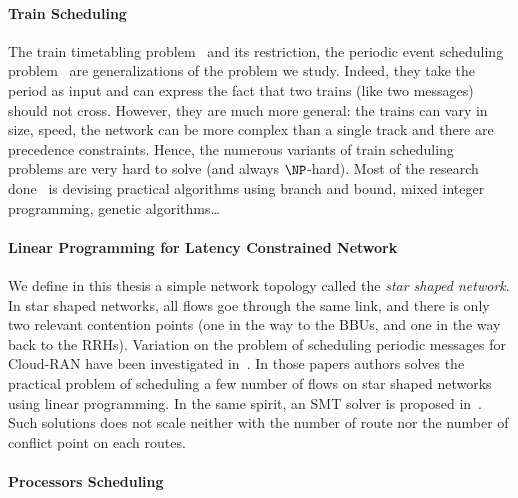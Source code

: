 \paragraph{Train Scheduling}

The train timetabling problem~\cite{lusby2011railway} and its restriction, the periodic event scheduling problem~\cite{serafini1989mathematical} are generalizations of the problem we study. Indeed, they take the period as input and can express the fact that two trains (like two messages) should not cross. However, they are much more general: the trains can vary in size, speed, the network can be more complex than a single track and there are precedence constraints. Hence, the numerous variants of train scheduling problems are very hard to solve (and always $\NP$-hard). Most of the research done~\cite{lusby2011railway} is devising practical algorithms using branch and bound, mixed integer programming, genetic algorithms\dots

\paragraph{Linear Programming for Latency Constrained Network}
We define in this thesis a simple network topology called the {\em star shaped network}. In star shaped networks, all flows goe through the same link, and there is only two relevant contention points (one in the way to the BBUs, and one in the way back to the RRHs).
Variation on the problem of scheduling periodic messages for Cloud-RAN have been investigated in~\cite{nayak2017incremental,steiner2018traffic,silviu2017,naresh2016}. In those papers authors solves the practical problem of scheduling a few number of flows on star shaped networks using linear programming. In the same spirit, an SMT solver is proposed in~\cite{dos2019tsnsched}. Such solutions does not scale neither with the number of route nor the number of conflict point on each routes.



\paragraph{Processors Scheduling}



